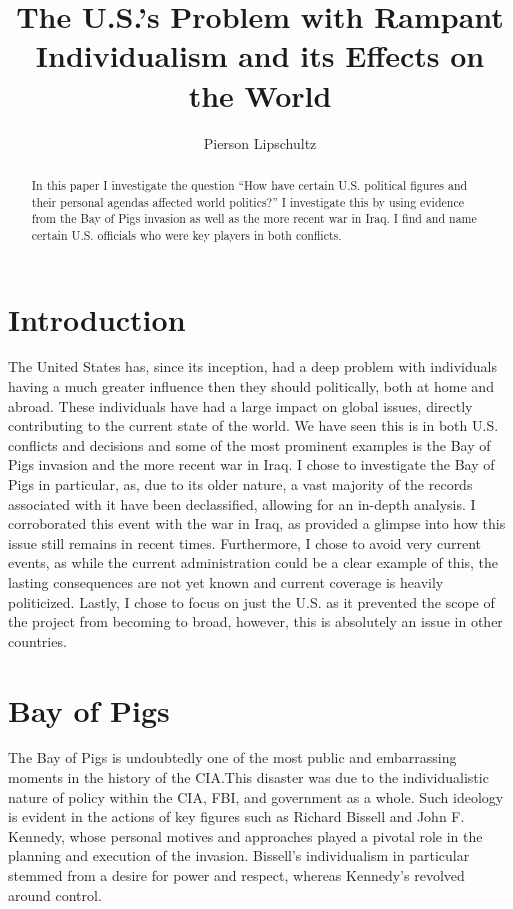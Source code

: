\documentclass[12pt, twoside]{article}
\title{The U.S.'s Problem with Rampant Individualism and its Effects on the World}
\author{Pierson Lipschultz}
\begin{document}
\maketitle

\begin{abstract}
    In this paper I investigate the question ``How have certain U.S. political figures and their personal agendas affected world politics?'' I investigate this by using evidence from the Bay of Pigs invasion as well as the more recent war in Iraq. I find and name certain U.S. officials who were key players in both conflicts.
\end{abstract}

\section{Introduction}

    The United States has, since its inception, had a deep problem with individuals having a much greater influence then they should politically, both at home and abroad. These individuals have had a large impact on global issues, directly contributing to the current state of the world. We have seen this is in both U.S. conflicts and decisions and some of the most prominent examples is the Bay of Pigs invasion and the more recent war in Iraq. I chose to investigate the Bay of Pigs in particular, as, due to its older nature, a vast majority of the records associated with it have been declassified, allowing for an in-depth analysis. I corroborated this event with the war in Iraq, as provided a glimpse into how this issue still remains in recent times. Furthermore, I chose to avoid very current events, as while the current administration could be a clear example of this, the lasting consequences are not yet known and current coverage is heavily politicized. Lastly, I chose to focus on just the U.S. as it prevented the scope of the project from becoming to broad, however, this is absolutely an issue in other countries.

\section{Bay of Pigs}

    The Bay of Pigs is undoubtedly one of the most public and embarrassing moments in the history of the CIA.\@ This disaster was due to the individualistic nature of policy within the CIA, FBI, and government as a whole. Such ideology is evident in the actions of key figures such as Richard Bissell and John F. Kennedy, whose personal motives and approaches played a pivotal role in the planning and execution of the invasion. Bissell's individualism in particular stemmed from a desire for power and respect, whereas Kennedy's revolved around control.~\parencite{JeffreysJones2003}
\end{document}
